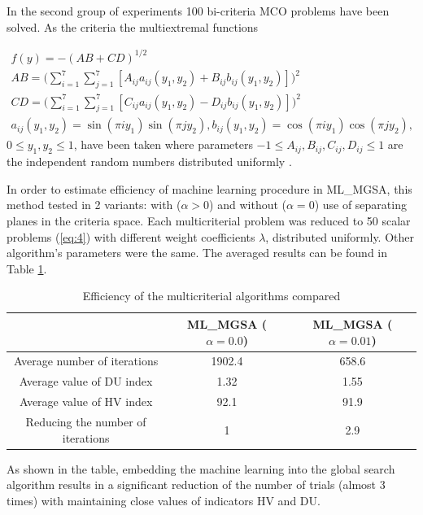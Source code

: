 \documentclass[runningheads]{llncs}
\begin{document}
In the second group of experiments 100 bi-criteria MCO problems have been solved. As the criteria the multiextremal functions

\begin{equation}
\begin{matrix}
f(y) = - (AB + CD)^{1/2} \\
AB = \Big(\sum_{i=1}^7 \sum_{j=1}^7 [A_{ij} a_{ij}(y_1, y_2) + B_{ij} b_{ij}(y_1, y_2)]\Big)^2 \\
CD = \Big(\sum_{i=1}^7 \sum_{j=1}^7 [C_{ij} a_{ij}(y_1, y_2) - D_{ij} b_{ij}(y_1, y_2)]\Big)^2 \\ 
a_{ij}(y_1, y_2) = \sin(\pi i y_1) \sin(\pi j y_2), b_{ij}(y_1, y_2) = \cos(\pi i y_1) \cos(\pi j y_2),
\end{matrix}
\end{equation}
$0 \leq y_1,y_2 \leq 1$, have been taken where parameters $-1 \leq A_{ij},B_{ij},C_{ij},D_{ij} \leq 1$ are the independent random numbers distributed uniformly \cite{Gergel2019_2,Grishagin2015_2}.

In order to estimate efficiency of machine learning procedure in ML\_MGSA, this method tested in 2 variants: with ($\alpha>0$) and without ($\alpha=0$)
use of separating planes in the criteria space. 
Each multicriterial problem was reduced to 50 scalar problems (\ref{eq:4}) with different weight coefficients $\lambda$, distributed uniformly. Other algorithm's parameters were the same. The averaged results can be found in Table \ref{tab:2}.

\begin{table}
\caption{Efficiency of the multicriterial algorithms compared}
\label{tab:2}
\begin{tabular}{ccc}
\hline
                                  & ML\_MGSA ($\alpha=0.0$) & ML\_MGSA ($\alpha=0.01$) \\ \hline
Average number of iterations      & 1902.4           & 658.6             \\
Average value of  DU index        & 1.32             & 1.55              \\
Average value of HV index         & 92.1             & 91.9              \\
Reducing the number of iterations & 1                & 2.9     \\  \hline        
\end{tabular}
\end{table}

As shown in the table, embedding the machine learning into the global search algorithm results in a significant reduction of the number of trials (almost 3 times) with maintaining close values of indicators HV and DU.

%
%
%
% 
% 
%


\end{document}
